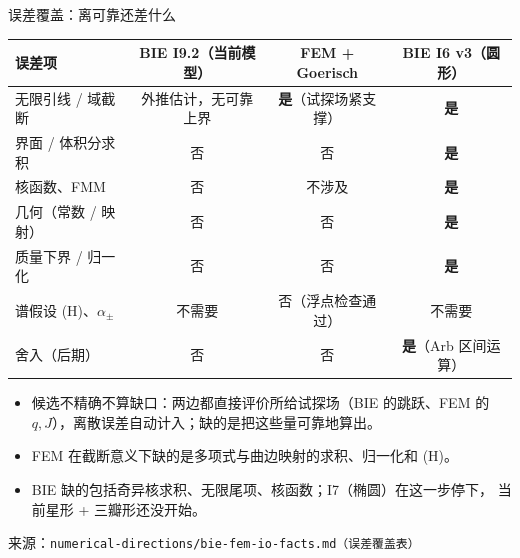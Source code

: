 \documentclass[aspectratio=169,11pt,fontset=fandol]{ctexbeamer}
\newcommand{\src}[1]{{\scriptsize\color{muted}来源：\texttt{#1}}}
\newcommand{\yes}{\textcolor{accent}{\textbf{是}}}
\newcommand{\no}{\textcolor{muted}{否}}
\begin{document}
\begin{frame}{误差覆盖：离可靠还差什么}
  \centering\footnotesize
  \begin{tabular}{lccc}
    \toprule
    误差项 & BIE I9.2（当前模型） & FEM + Goerisch & BIE I6 v3（圆形） \\
    \midrule
    无限引线 / 域截断 & 外推估计，无可靠上界 & \yes（试探场紧支撑） & \yes \\
    界面 / 体积分求积 & \no & \no & \yes \\
    核函数、FMM & \no & 不涉及 & \yes \\
    几何（常数 / 映射） & \no & \no & \yes \\
    质量下界 / 归一化 & \no & \no & \yes \\
    谱假设 (H)、$\alpha_\pm$ & 不需要 & \no（浮点检查通过） & 不需要 \\
    舍入（后期） & \no & \no & \yes（Arb 区间运算） \\
    \bottomrule
  \end{tabular}
  \par\raggedright\vspace{0.2em}
  \begin{itemize}\small
    \item 候选不精确\alert{不算缺口}：两边都直接评价所给试探场（BIE 的跳跃、FEM 的 $q,J$），离散误差自动计入；缺的是把这些量可靠地算出。
    \item FEM 在截断意义下缺的是\alert{多项式与曲边映射的求积、归一化和 (H)}。
    \item BIE 缺的包括\alert{奇异核求积、无限尾项、核函数}；I7（椭圆）在这一步停下，
      当前星形 + 三瓣形还没开始。
  \end{itemize}
  \src{numerical-directions/bie-fem-io-facts.md（误差覆盖表）}
\end{frame}
\end{document}
